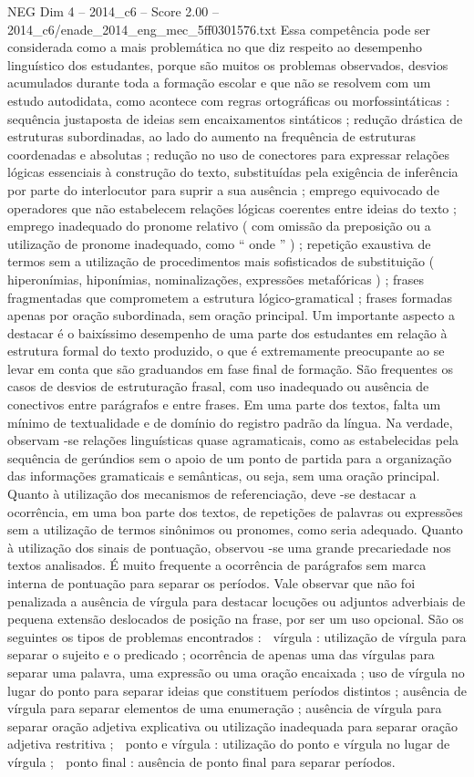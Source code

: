 \begin{textsample}{NEG Dim 4 – 2014\_c6 – Score 2.00 – 2014\_c6/enade\_2014\_eng\_mec\_5ff0301576.txt}
Essa competência pode ser considerada como a mais problemática no que diz respeito ao desempenho linguístico dos estudantes, porque são muitos os problemas observados, desvios acumulados durante toda a formação escolar e que não se resolvem com um estudo autodidata, como acontece com regras ortográficas ou morfossintáticas : sequência justaposta de ideias sem encaixamentos sintáticos ; redução drástica de estruturas subordinadas, ao lado do aumento na frequência de estruturas coordenadas e absolutas ; redução no uso de conectores para expressar relações lógicas essenciais à construção do texto, substituídas pela exigência de inferência por parte do interlocutor para suprir a sua ausência ; emprego equivocado de operadores que não estabelecem relações lógicas coerentes entre ideias do texto ; emprego inadequado do pronome relativo ( com omissão da preposição ou a utilização de pronome inadequado, como “ onde ” ) ; repetição exaustiva de termos sem a utilização de procedimentos mais sofisticados de substituição ( hiperonímias, hiponímias, nominalizações, expressões metafóricas ) ; frases fragmentadas que comprometem a estrutura lógico-gramatical ; frases formadas apenas por oração subordinada, sem oração principal.
Um importante aspecto a destacar é o baixíssimo desempenho de uma parte dos estudantes em relação à estrutura formal do texto produzido, o que é extremamente preocupante ao se levar em conta que são graduandos em fase final de formação.
São frequentes os casos de desvios de estruturação frasal, com uso inadequado ou ausência de conectivos entre parágrafos e entre frases.
Em uma parte dos textos, falta um mínimo de textualidade e de domínio do registro padrão da língua.
Na verdade, observam -se relações linguísticas quase agramaticais, como as estabelecidas pela sequência de gerúndios sem o apoio de um ponto de partida para a organização das informações gramaticais e semânticas, ou seja, sem uma oração principal.
Quanto à utilização dos mecanismos de referenciação, deve -se destacar a ocorrência, em uma boa parte dos textos, de repetições de palavras ou expressões sem a utilização de termos sinônimos ou pronomes, como seria adequado.
Quanto à utilização dos sinais de pontuação, observou -se uma grande precariedade nos textos analisados.
É muito frequente a ocorrência de parágrafos sem marca interna de pontuação para separar os períodos.
Vale observar que não foi penalizada a ausência de vírgula para destacar locuções ou adjuntos adverbiais de pequena extensão deslocados de posição na frase, por ser um uso opcional.
São os seguintes os tipos de problemas encontrados :  vírgula : utilização de vírgula para separar o sujeito e o predicado ; ocorrência de apenas uma das vírgulas para separar uma palavra, uma expressão ou uma oração encaixada ; uso de vírgula no lugar do ponto para separar ideias que constituem períodos distintos ; ausência de vírgula para separar elementos de uma enumeração ; ausência de vírgula para separar oração adjetiva explicativa ou utilização inadequada para separar oração adjetiva restritiva ;  ponto e vírgula : utilização do ponto e vírgula no lugar de vírgula ;  ponto final : ausência de ponto final para separar períodos.

\end{textsample}
